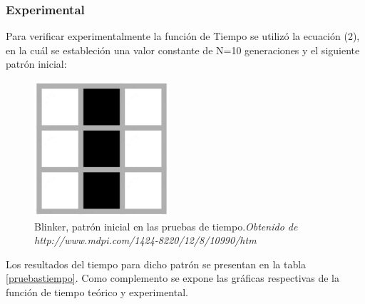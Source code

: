 \documentclass[12pt,letterpaper]{article}
\begin{document}
\subsubsection{Experimental}
Para verificar experimentalmente la función de Tiempo se utilizó la ecuación (2), en la cuál se estableción una valor constante de N=10 generaciones y el siguiente patrón inicial:


\begin{figure}[H]
\centering
\includegraphics[height= 5cm, width= 5cm]{img/blinker}
\caption{\label{blinker} Blinker, patrón inicial en las pruebas de tiempo.\textit{Obtenido de http://www.mdpi.com/1424-8220/12/8/10990/htm}}
\end{figure}

Los resultados del tiempo para dicho patrón se presentan en la tabla \ref{pruebastiempo}.
Como complemento se expone las gráficas respectivas de la función de tiempo teórico y experimental.
\end{document}
